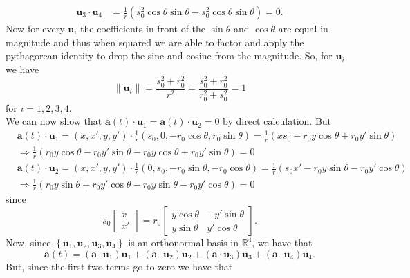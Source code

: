 \documentclass{exam}
\newcommand{\RR}{\mathbb R}
\newcommand{\braces}[1]{\ensuremath{\left\{#1 \right\}}}
\begin{document}
\begin{questions}
\begin{solution}
\begin{align*}
            \mathbf{u}_3 \cdot \mathbf{u}_4 &= \frac{1}{r}(s_0^2 \cos \theta \sin \theta - s_0^2 \cos \theta \sin \theta) = 0.
        \end{align*}
        Now for every $\mathbf{u}_i$ the coefficients in front of the $\sin \theta$ and $\cos \theta$ are equal in magnitude and thus when squared we are able to factor and apply the pythagorean identity to drop the sine and cosine from the magnitude. So, for $\mathbf{u}_i$ we have 
        \[
            \| \mathbf{u}_i \| = \frac{s_0^2 + r_0^2}{r^2} = \frac{s_0^2 + r_0^2}{r_0^2 + s_0^2} = 1
        \]
        for $i = 1, 2, 3, 4$. \\
        We can now show that $\mathbf{a}(t) \cdot \mathbf{u}_1 = \mathbf{a}(t) \cdot \mathbf{u}_2 = 0$ by direct calculation. But
        \begin{align*}
            &\mathbf{a}(t) \cdot \mathbf{u}_1 = (x, x', y, y') \cdot \frac{1}{r}(s_0, 0, -r_0\cos\theta, r_0 \sin \theta) = \frac{1}{r}(xs_0 - r_0 y\cos \theta + r_0 y' \sin \theta) \\
            &\Rightarrow \frac{1}{r}(r_0 y \cos \theta - r_0 y' \sin \theta - r_0 y \cos \theta + r_0 y' \sin \theta) = 0 \\
            &\mathbf{a}(t) \cdot \mathbf{u}_2 = (x, x', y, y') \cdot \frac{1}{r}(0, s_0, -r_0 \sin \theta, -r_0 \cos \theta) = \frac{1}{r}(s_0 x' - r_0 y \sin \theta - r_0 y' \cos \theta) \\
            &\Rightarrow \frac{1}{r}(r_0 y \sin \theta + r_0 y' \cos \theta - r_0 y \sin \theta - r_0 y' \cos \theta) = 0
        \end{align*}
        since 
        \[
            s_0\begin{bmatrix}
                x \\ x'
            \end{bmatrix} 
            = r_0\begin{bmatrix}
                y\cos \theta & -y'\sin \theta \\
                y\sin \theta & y'\cos \theta
            \end{bmatrix}.
        \]
        Now, since $\braces{\mathbf{u}_1, \mathbf{u}_2, \mathbf{u}_3, \mathbf{u}_4}$ is an orthonormal basis in $\RR^{4}$, we have that 
        \[
            \mathbf{a}(t) = (\mathbf{a} \cdot \mathbf{u}_1)\mathbf{u}_1 + (\mathbf{a} \cdot \mathbf{u}_2)\mathbf{u}_2 + (\mathbf{a} \cdot \mathbf{u}_3)\mathbf{u}_3 + (\mathbf{a} \cdot \mathbf{u}_4)\mathbf{u}_4.
        \]
        But, since the first two terms go to zero we have that 

\end{solution}
\end{questions}
\end{document}
